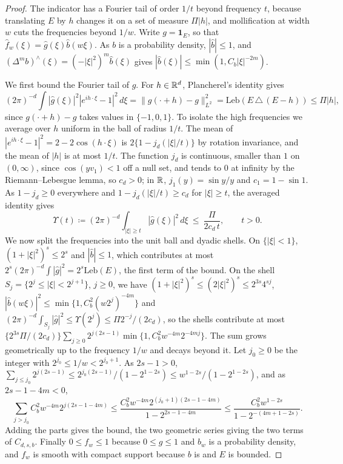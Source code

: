 \begin{proof}
The indicator has a Fourier tail of order $1/t$ beyond frequency $t$, because translating $E$ by $h$ changes it on a set of
measure $\Pi|h|$, and mollification at width $w$ cuts the frequencies beyond $1/w$. Write $g=\mathbf 1_E$, so that
$\widehat f_w(\xi)=\widehat g(\xi)\widehat b(w\xi)$. As $b$ is a probability density, $|\widehat b|\le1$, and
$(\Delta^mb)^\wedge(\xi)=(-|\xi|^2)^m\widehat b(\xi)$ gives $|\widehat b(\xi)|\le\min(1,C_b|\xi|^{-2m})$.

We first bound the Fourier tail of $g$. For $h\in\mathbb{R}^d$, Plancherel's identity gives
\[
(2\pi)^{-d}\int|\widehat g(\xi)|^2|e^{ih\cdot\xi}-1|^2\,d\xi=\|g(\cdot+h)-g\|_{L^2}^2=\mathrm{Leb}(E\,\triangle\,(E-h))\le\Pi|h| ,
\]
since $g(\cdot+h)-g$ takes values in $\{-1,0,1\}$. To isolate the high frequencies we average over $h$ uniform in the
ball of radius $1/t$. The mean of $|e^{ih\cdot\xi}-1|^2=2-2\cos(h\cdot\xi)$ is $2\{1-j_d(|\xi|/t)\}$ by rotation
invariance, and the mean of $|h|$ is at most $1/t$. The function $j_d$ is continuous, smaller than $1$ on $(0,\infty)$,
since $\cos(yv_1)<1$ off a null set, and tends to $0$ at infinity by the Riemann--Lebesgue lemma, so $c_d>0$; in $\mathbb{R}$,
$j_1(y)=\sin y/y$ and $c_1=1-\sin1$. As $1-j_d\ge0$ everywhere and $1-j_d(|\xi|/t)\ge c_d$ for $|\xi|\ge t$, the
averaged identity gives
\[
\Upsilon(t)\coloneqq(2\pi)^{-d}\int_{|\xi|\ge t}|\widehat g(\xi)|^2\,d\xi\ \le\ \frac{\Pi}{2c_d\,t},\qquad t>0 .
\]
We now split the frequencies into the unit ball and dyadic shells. On $\{|\xi|<1\}$, $(1+|\xi|^2)^s\le2^s$ and
$|\widehat b|\le1$, which contributes at most $2^s(2\pi)^{-d}\int|\widehat g|^2=2^s\mathrm{Leb}(E)$, the first term of
the bound. On the shell $S_j=\{2^j\le|\xi|<2^{j+1}\}$, $j\ge0$, we have $(1+|\xi|^2)^s\le(2|\xi|^2)^s\le2^{3s}4^{sj}$,
$|\widehat b(w\xi)|^2\le\min\{1,C_b^2(w2^j)^{-4m}\}$ and $(2\pi)^{-d}\int_{S_j}|\widehat g|^2\le\Upsilon(2^j)\le\Pi2^{-j}/(2c_d)$,
so the shells contribute at most $\{2^{3s}\Pi/(2c_d)\}\sum_{j\ge0}2^{j(2s-1)}\min\{1,C_b^2w^{-4m}2^{-4mj}\}$. The sum grows geometrically up to the frequency $1/w$ and decays beyond it. Let $j_0\ge0$ be the integer with $2^{j_0}\le1/w<2^{j_0+1}$. As $2s-1>0$,
$\sum_{j\le j_0}2^{j(2s-1)}\le2^{j_0(2s-1)}/(1-2^{1-2s})\le w^{1-2s}/(1-2^{1-2s})$, and as $2s-1-4m<0$,
\[
\sum_{j>j_0}C_b^2w^{-4m}2^{j(2s-1-4m)}\le\frac{C_b^2w^{-4m}2^{(j_0+1)(2s-1-4m)}}{1-2^{2s-1-4m}}\le\frac{C_b^2w^{1-2s}}{1-2^{-(4m+1-2s)}} .
\]
Adding the parts gives the bound, the two geometric series giving the two terms of $C_{d,s,b}$. Finally $0\le f_w\le1$ because $0\le g\le1$ and $b_w$ is a probability density, and
$f_w$ is smooth with compact support because $b$ is and $E$ is bounded.
\end{proof}

